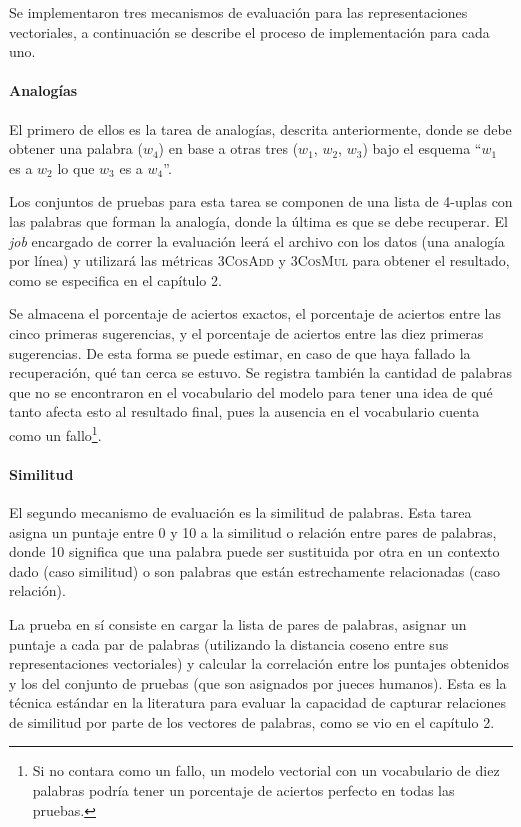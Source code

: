 Se implementaron tres mecanismos de evaluación para las representaciones vectoriales, a
continuación se describe el proceso de implementación para cada uno.


\paragraph{Analogías}

El primero de ellos es la tarea de analogías, descrita anteriormente, donde se debe obtener una
palabra ($w_4$) en base a otras tres ($w_1$, $w_2$, $w_3$) bajo el esquema ``$w_1$ es a $w_2$ lo que
$w_3$ es a $w_4$''.

Los conjuntos de pruebas para esta tarea se componen de una lista de 4-uplas con las palabras que
forman la analogía, donde la última es que se debe recuperar. El \textit{job} encargado de correr la
evaluación leerá el archivo con los datos (una analogía por línea) y utilizará las métricas
\textsc{3CosAdd} y \textsc{3CosMul} para obtener el resultado, como se especifica en el capítulo
2.

Se almacena el porcentaje de aciertos exactos, el porcentaje de aciertos entre las cinco primeras
sugerencias, y el porcentaje de aciertos entre las diez primeras sugerencias. De esta forma se puede
estimar, en caso de que haya fallado la recuperación, qué tan cerca se estuvo. Se registra también
la cantidad de palabras que no se encontraron en el vocabulario del modelo para tener una idea de
qué tanto afecta esto al resultado final, pues la ausencia en el vocabulario cuenta como un
fallo\footnote{Si no contara como un fallo, un modelo vectorial con un vocabulario de diez palabras
podría tener un porcentaje de aciertos perfecto en todas las pruebas.}.


\paragraph{Similitud}

El segundo mecanismo de evaluación es la similitud de palabras. Esta tarea asigna un puntaje entre 0
y 10 a la similitud o relación entre pares de palabras, donde 10 significa que una palabra puede ser
sustituida por otra en un contexto dado (caso similitud) o son palabras que están estrechamente
relacionadas (caso relación).

La prueba en sí consiste en cargar la lista de pares de palabras, asignar un puntaje a cada par de
palabras (utilizando la distancia coseno entre sus representaciones vectoriales) y calcular la
correlación entre los puntajes obtenidos y los del conjunto de pruebas (que son asignados por jueces
humanos). Esta es la técnica estándar en la literatura para evaluar la capacidad de capturar
relaciones de similitud por parte de los vectores de palabras, como se vio en el capítulo 2.

